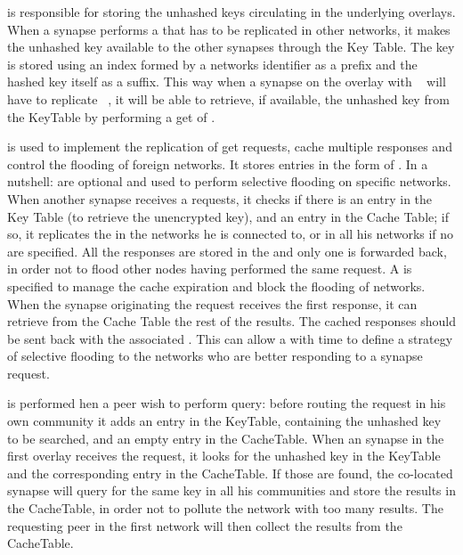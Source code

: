 %
is responsible for storing the unhashed keys circulating in the
underlying overlays.  When a synapse performs a  that has to
be replicated in other networks, it makes the unhashed key available
to the other synapses through the Key Table. The key is stored using
an index formed by a networks identifier as a prefix and the hashed
key itself as a suffix. This way when a synapse on the overlay with
\eg\  will have to replicate \eg\ , it
will be able to retrieve, if available, the unhashed key from the
KeyTable by performing a get of .

%
is used to implement the replication of get requests, cache multiple
responses and control the flooding of foreign networks.  It stores
entries in the form of .  In a
nutshell:  are optional and used to perform selective
flooding on specific networks.  When another synapse receives a
 requests, it checks if there is an entry in the Key Table
(to retrieve the unencrypted key), and an entry in the Cache Table; if
so, it replicates the  in the \key{[NETID]} networks he is
connected to, or in all his networks if no \key{[NETID]} are
specified. All the responses are stored in the \key{[CACHE]} and only
one is forwarded back, in order not to flood other nodes having
performed the same request. A  is specified to manage the
cache expiration and block the flooding of networks.  When the synapse
originating the request receives the first response, it can retrieve
from the Cache Table the rest of the results.  The cached responses
should be sent back with the associated . This can allow a
with time to define a strategy of selective flooding to the networks
who are better responding to a synapse request.

 is performed hen a peer
wish to perform query: before routing the request in his own community
it adds an entry in the KeyTable, containing the unhashed key to be
searched, and an empty entry in the CacheTable.  When an synapse in
the first overlay receives the request, it looks for the unhashed key
in the KeyTable and the corresponding entry in the CacheTable. If
those are found, the co-located synapse will query for the same key in
all his communities and store the results in the CacheTable, in order
not to pollute the network with too many results. The requesting peer
in the first network will then collect the results from the
CacheTable.

